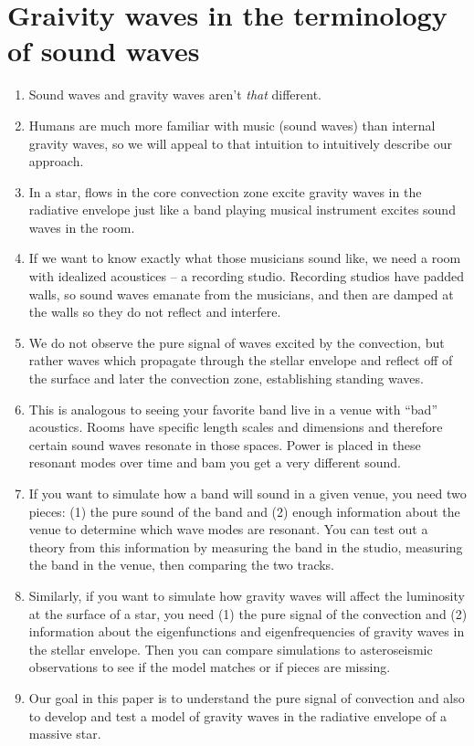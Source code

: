 \section{Graivity waves in the terminology of sound waves}
\label{sec:music}

\begin{enumerate}
\item Sound waves and gravity waves aren't \emph{that} different.
\item Humans are much more familiar with music (sound waves) than internal gravity waves, so we will appeal to that intuition to intuitively describe our approach.
\item In a star, flows in the core convection zone excite gravity waves in the radiative envelope just like a band playing musical instrument excites sound waves in the room.
\item If we want to know exactly what those musicians sound like, we need a room with idealized acoustices -- a recording studio. Recording studios have padded walls, so sound waves emanate from the musicians, and then are damped at the walls so they do not reflect and interfere.
\item We do not observe the pure signal of waves excited by the convection, but rather waves which propagate through the stellar envelope and reflect off of the surface and later the convection zone, establishing standing waves.
\item This is analogous to seeing your favorite band live in a venue with ``bad'' acoustics. Rooms have specific length scales and dimensions and therefore certain sound waves resonate in those spaces. Power is placed in these resonant modes over time and bam you get a very different sound.
\item If you want to simulate how a band will sound in a given venue, you need two pieces: (1) the pure sound of the band and (2) enough information about the venue to determine which wave modes are resonant. You can test out a theory from this information by measuring the band in the studio, measuring the band in the venue, then comparing the two tracks.
\item Similarly, if you want to simulate how gravity waves will affect the luminosity at the surface of a star, you need (1) the pure signal of the convection and (2) information about the eigenfunctions and eigenfrequencies of gravity waves in the stellar envelope. Then you can compare simulations to asteroseismic observations to see if the model matches or if pieces are missing.
\item Our goal in this paper is to understand the pure signal of convection and also to develop and test a model of gravity waves in the radiative envelope of a massive star.
\end{enumerate}

